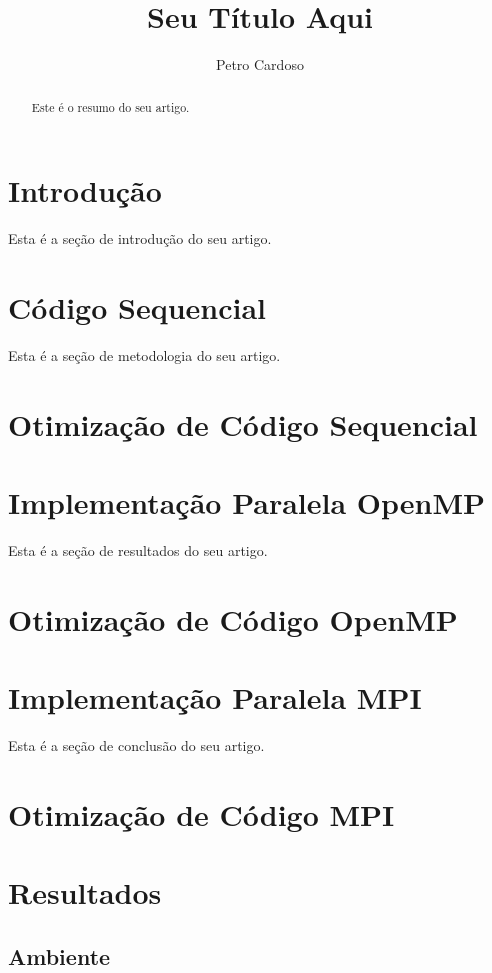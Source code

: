 \documentclass[a4paper]{IEEEtran}
\begin{document}
\title{Seu Título Aqui}
\author{Petro Cardoso}
\maketitle

\begin{abstract}
    Este é o resumo do seu artigo.
\end{abstract}

\section{Introdução}
Esta é a seção de introdução do seu artigo.

\section{Código Sequencial} %
Esta é a seção de metodologia do seu artigo.

\section{Otimização de Código Sequencial}

\section{Implementação Paralela OpenMP}
Esta é a seção de resultados do seu artigo.

\section{Otimização de Código OpenMP}

\section{Implementação Paralela MPI}
Esta é a seção de conclusão do seu artigo.

\section{Otimização de Código MPI}

\section{Resultados}

\subsection{Ambiente}
\end{document}
